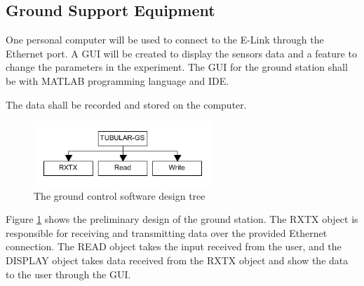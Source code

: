 \pagebreak
\subsection{Ground Support Equipment}
One personal computer will be used to connect to the E-Link through the Ethernet port. A GUI will be created to display the sensors data and a feature to change the parameters in the experiment. The GUI for the ground station shall be with MATLAB programming language and IDE.\par
The data shall be recorded and stored on the computer. 
\begin{figure}[H]
    \centering
    \includegraphics[width=0.6\textwidth]{4-experiment-design/img/gc-software-V1-2.png}
    \caption{The ground control software design tree}
    \label{fig:gcModel}
\end{figure}
Figure \ref{fig:gcModel} shows the preliminary design of the ground station. The RXTX object is responsible for receiving and transmitting data over the provided Ethernet connection. The READ object takes the input received from the user, and the DISPLAY object takes data received from the RXTX object and show the data to the user through the GUI.


\raggedbottom